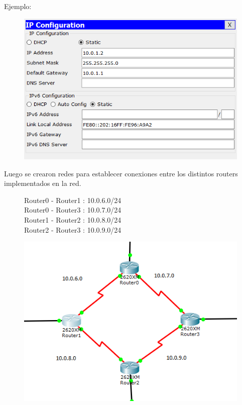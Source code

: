 \documentclass[spanish]{udpreport}
\begin{document}
Ejemplo:
\begin{figure}[H]
\begin{center}
\includegraphics[scale=1]{images/ejemplo1.PNG}
\end{center}
\end{figure}

\vspace{16cm}
Luego se crearon redes para establecer conexiones entre los distintos routers implementados en la red.
\begin{figure}[H]
\begin{center}
Router0 - Router1 : 10.0.6.0/24\\
Router0 - Router3 : 10.0.7.0/24\\
Router1 - Router2 : 10.0.8.0/24\\
Router2 - Router3 : 10.0.9.0/24
\end{center}
\end{figure}

\begin{figure}[H]
\begin{center}
\includegraphics[scale=1]{images/Routers.PNG}
\end{center}
\end{figure}
\end{document}
